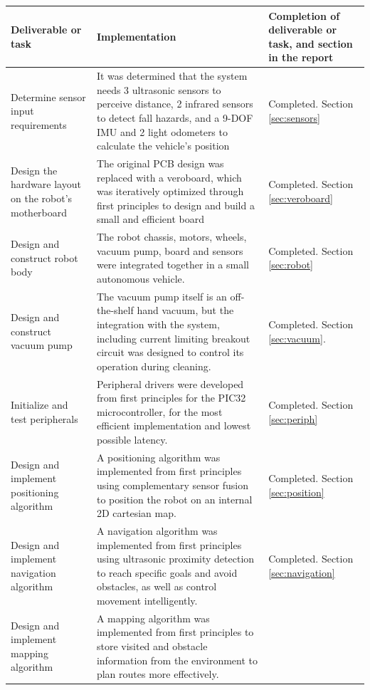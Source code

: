 \begin{longtable}[H]{|p{}|p{}|p{}|} \hline
    \textbf{Deliverable or task} & \textbf{Implementation} & \textbf{Completion of deliverable or task, and section in the report} \\ \hline
    Determine sensor input requirements & 
    It was determined that the system needs 3 ultrasonic sensors to perceive distance, 2 infrared sensors to detect fall hazards, and a 9-DOF IMU and 2 light odometers to calculate the vehicle's position &
    Completed. Section \ref{sec:sensors} \\ \hline
    Design the hardware layout on the robot's motherboard &
    The original PCB design was replaced with a veroboard, which was iteratively optimized through first principles to design and build a small and efficient board & 
    Completed. Section \ref{sec:veroboard} \\ \hline
    Design and construct robot body &
    The robot chassis, motors, wheels, vacuum pump, board and sensors were integrated together in a small autonomous vehicle. & 
    Completed. Section \ref{sec:robot} \\ \hline
    Design and construct vacuum pump &
    The vacuum pump itself is an off-the-shelf hand vacuum, but the integration with the system, including current limiting breakout circuit was designed to control its operation during cleaning. &
    Completed. Section \ref{sec:vacuum}. \\ \hline
    Initialize and test peripherals &
    Peripheral drivers were developed from first principles for the PIC32 microcontroller, for the most efficient implementation and lowest possible latency. &
    Completed. Section \ref{sec:periph} \\ \hline
    Design and implement positioning algorithm &
    A positioning algorithm was implemented from first principles using complementary sensor fusion to position the robot on an internal 2D cartesian map. &
    Completed. Section \ref{sec:position} \\ \hline
    Design and implement navigation algorithm &
    A navigation algorithm was implemented from first principles using ultrasonic proximity detection to reach specific goals and avoid obstacles, as well as control movement intelligently. &
    Completed. Section \ref{sec:navigation} \\ \hline
    Design and implement mapping algorithm &
    A mapping algorithm was implemented from first principles to store visited and obstacle information from the environment to plan routes more effectively. &

\end{longtable}
